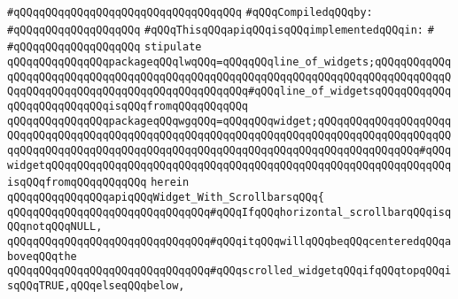\verb|#qQQqqQQqqQQqqQQqqQQqqQQqqQQqqQQqqQQq|\newline
\newline
\verb|#qQQqCompiledqQQqby:|\newline
\verb|#qQQqqQQqqQQqqQQqqQQq|\newline
\newline
\newline
\newline
\verb|#qQQqThisqQQqapiqQQqisqQQqimplementedqQQqin:|\newline
\verb|#|\newline
\verb|#qQQqqQQqqQQqqQQqqQQq|\newline
\newline
\verb|stipulate|\newline
\verb|qQQqqQQqqQQqqQQqpackageqQQqlwqQQq=qQQqqQQqline_of_widgets;qQQqqQQqqQQqqQQqqQQqqQQqqQQqqQQqqQQqqQQqqQQqqQQqqQQqqQQqqQQqqQQqqQQqqQQqqQQqqQQqqQQqqQQqqQQqqQQqqQQqqQQqqQQqqQQqqQQqqQQq#qQQqline_of_widgetsqQQqqQQqqQQqqQQqqQQqqQQqqQQqisqQQqfromqQQqqQQqqQQq|\newline
\verb|qQQqqQQqqQQqqQQqpackageqQQqwgqQQq=qQQqqQQqwidget;qQQqqQQqqQQqqQQqqQQqqQQqqQQqqQQqqQQqqQQqqQQqqQQqqQQqqQQqqQQqqQQqqQQqqQQqqQQqqQQqqQQqqQQqqQQqqQQqqQQqqQQqqQQqqQQqqQQqqQQqqQQqqQQqqQQqqQQqqQQqqQQqqQQqqQQqqQQq#qQQqwidgetqQQqqQQqqQQqqQQqqQQqqQQqqQQqqQQqqQQqqQQqqQQqqQQqqQQqqQQqqQQqqQQqisqQQqfromqQQqqQQqqQQq|\newline
\verb|herein|\newline
\newline
\verb|qQQqqQQqqQQqqQQqapiqQQqWidget_With_ScrollbarsqQQq{|\newline
\newline
\verb|qQQqqQQqqQQqqQQqqQQqqQQqqQQqqQQq#qQQqIfqQQqhorizontal_scrollbarqQQqisqQQqnotqQQqNULL,|\newline
\verb|qQQqqQQqqQQqqQQqqQQqqQQqqQQqqQQq#qQQqitqQQqwillqQQqbeqQQqcenteredqQQqaboveqQQqthe|\newline
\verb|qQQqqQQqqQQqqQQqqQQqqQQqqQQqqQQq#qQQqscrolled_widgetqQQqifqQQqtopqQQqisqQQqTRUE,qQQqelseqQQqbelow,|\newline
